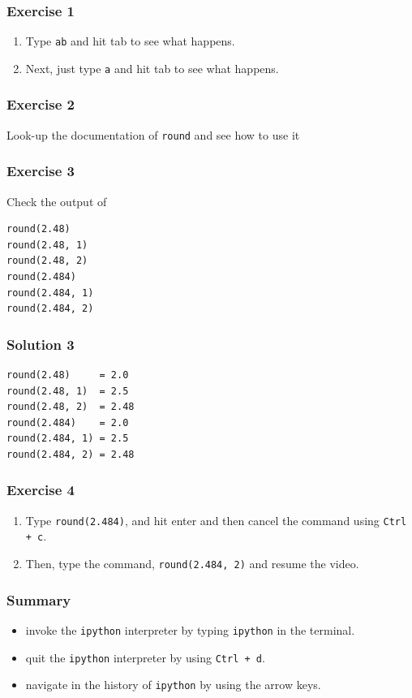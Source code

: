 \documentclass[17pt,compress]{beamer}
\begin{document}
\begin{frame}
\frametitle{Exercise 1}
\begin{enumerate}
\item Type \texttt{ab} and hit tab to see what happens.\pause
\item Next, just type \texttt{a} and hit tab to see what happens.
\end{enumerate}
\end{frame}
\begin{frame}
\frametitle{Exercise 2}
Look-up the documentation of \texttt{round} and see how to use it
\end{frame}
\begin{frame}[fragile]
\frametitle{Exercise 3}
Check the output of
\lstset{language=Python}
\begin{lstlisting}
round(2.48)
round(2.48, 1)
round(2.48, 2)
round(2.484)
round(2.484, 1)
round(2.484, 2)
\end{lstlisting}
\end{frame}
\begin{frame}[fragile]
\frametitle{Solution 3}
\lstset{language=Python}
\begin{lstlisting}
round(2.48)     = 2.0
round(2.48, 1)  = 2.5
round(2.48, 2)  = 2.48
round(2.484)    = 2.0 
round(2.484, 1) = 2.5
round(2.484, 2) = 2.48
\end{lstlisting}
\end{frame}
\begin{frame}
\frametitle{Exercise 4}
\begin{enumerate}
\item Type \texttt{round(2.484)}, and hit enter and then cancel the command
using \texttt{Ctrl + c}.\pause
\item Then, type the command, \texttt{round(2.484, 2)} and resume
the video.
\end{enumerate}
\end{frame}
\begin{frame}
\frametitle{Summary}
\begin{itemize}
\item invoke the \texttt{ipython} interpreter by typing \texttt{ipython} in the terminal.
\item quit the \texttt{ipython} interpreter by using \texttt{Ctrl + d}.
\item navigate in the history of \texttt{ipython} by using the arrow keys.
\end{itemize}
\end{frame}
\end{document}
